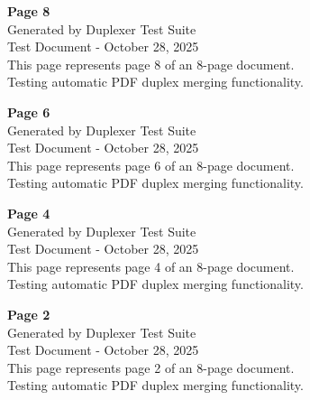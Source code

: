\documentclass[12pt,letterpaper]{article}
\begin{document}
\begin{center}
\vspace{3in}
{\Huge \textbf{Page 8}}\\
\vspace{1in}
{\Large Generated by Duplexer Test Suite}\\
\vspace{0.5in}
{\large Test Document - October 28, 2025}\\
\vspace{0.5in}
{\normalsize This page represents page 8 of an 8-page document.}\\
{\normalsize Testing automatic PDF duplex merging functionality.}
\end{center}
\clearpage

\begin{center}
\vspace{3in}
{\Huge \textbf{Page 6}}\\
\vspace{1in}
{\Large Generated by Duplexer Test Suite}\\
\vspace{0.5in}
{\large Test Document - October 28, 2025}\\
\vspace{0.5in}
{\normalsize This page represents page 6 of an 8-page document.}\\
{\normalsize Testing automatic PDF duplex merging functionality.}
\end{center}
\clearpage

\begin{center}
\vspace{3in}
{\Huge \textbf{Page 4}}\\
\vspace{1in}
{\Large Generated by Duplexer Test Suite}\\
\vspace{0.5in}
{\large Test Document - October 28, 2025}\\
\vspace{0.5in}
{\normalsize This page represents page 4 of an 8-page document.}\\
{\normalsize Testing automatic PDF duplex merging functionality.}
\end{center}
\clearpage

\begin{center}
\vspace{3in}
{\Huge \textbf{Page 2}}\\
\vspace{1in}
{\Large Generated by Duplexer Test Suite}\\
\vspace{0.5in}
{\large Test Document - October 28, 2025}\\
\vspace{0.5in}
{\normalsize This page represents page 2 of an 8-page document.}\\
{\normalsize Testing automatic PDF duplex merging functionality.}
\end{center}
\clearpage
\end{document}
